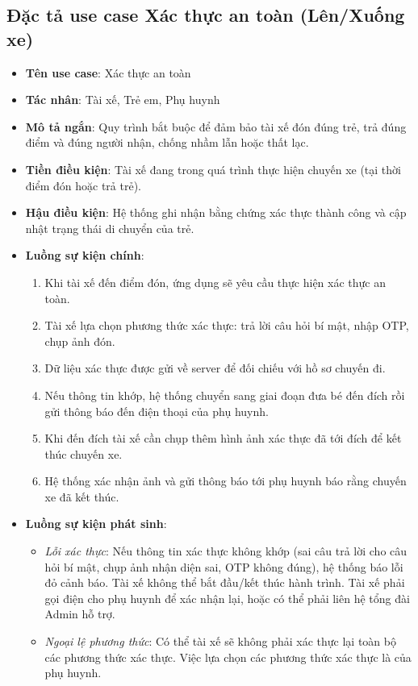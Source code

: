\documentclass[../DoAn.tex]{subfiles}
\begin{document}
\subsection{Đặc tả use case Xác thực an toàn (Lên/Xuống xe)}
\begin{itemize}
    \item \textbf{Tên use case}: Xác thực an toàn
    \item \textbf{Tác nhân}: Tài xế, Trẻ em, Phụ huynh
    \item \textbf{Mô tả ngắn}: Quy trình bắt buộc để đảm bảo tài xế đón đúng trẻ, trả đúng điểm và đúng người nhận, chống nhầm lẫn hoặc thất lạc.
    \item \textbf{Tiền điều kiện}: Tài xế đang trong quá trình thực hiện chuyến xe (tại thời điểm đón hoặc trả trẻ).
    \item \textbf{Hậu điều kiện}: Hệ thống ghi nhận bằng chứng xác thực thành công và cập nhật trạng thái di chuyển của trẻ.
    \item \textbf{Luồng sự kiện chính}:
          \begin{enumerate}
              \item Khi tài xế đến điểm đón, ứng dụng sẽ yêu cầu thực hiện xác thực an toàn.
              \item Tài xế lựa chọn phương thức xác thực: trả lời câu hỏi bí mật, nhập OTP, chụp ảnh đón.
              \item Dữ liệu xác thực được gửi về server để đối chiếu với hồ sơ chuyến đi.
              \item Nếu thông tin khớp, hệ thống chuyển sang giai đoạn đưa bé đến đích rồi gửi thông báo đến điện thoại của phụ huynh.
              \item Khi đến đích tài xế cần chụp thêm hình ảnh xác thực đã tới đích để kết thúc chuyến xe.
              \item Hệ thống xác nhận ảnh và gửi thông báo tới phụ huynh báo rằng chuyến xe đã kết thúc.
          \end{enumerate}
    \item \textbf{Luồng sự kiện phát sinh}:
          \begin{itemize}
              \item \textit{Lỗi xác thực}: Nếu thông tin xác thực không khớp (sai câu trả lời cho câu hỏi bí mật, chụp ảnh nhận diện sai, OTP không đúng), hệ thống báo lỗi đỏ cảnh báo. Tài xế không thể bắt đầu/kết thúc hành trình. Tài xế phải gọi điện cho phụ huynh để xác nhận lại, hoặc có thể phải liên hệ tổng đài Admin hỗ trợ.
              \item \textit{Ngoại lệ phương thức}: Có thể tài xế sẽ không phải xác thực lại toàn bộ các phương thức xác thực. Việc lựa chọn các phương thức xác thực là của phụ huynh.
          \end{itemize}
\end{itemize}
\end{document}
